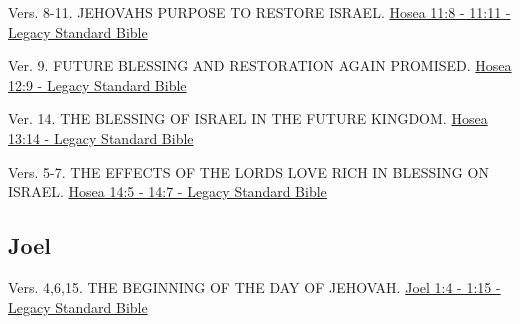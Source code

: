 \documentclass[
  ignorenonframetext,
]{beamer}
\begin{document}
\begin{frame}{11}
\label{section-115}
\begin{block}{Vers. 8-11. JEHOVAH\textquotesingle S PURPOSE TO RESTORE
ISRAEL.}
\label{vers.-8-11.-jehovahs-purpose-to-restore-israel.}
\href{https://read.lsbible.org/?q=hos11\%3A8-11}{Hosea 11:8 - 11:11 -
Legacy Standard Bible}
\end{block}
\end{frame}

\begin{frame}{12}
\label{section-116}
\begin{block}{Ver. 9. FUTURE BLESSING AND RESTORATION AGAIN PROMISED.}
\label{ver.-9.-future-blessing-and-restoration-again-promised.}
\href{https://read.lsbible.org/?q=hos12\%3A9}{Hosea 12:9 - Legacy
Standard Bible}
\end{block}
\end{frame}

\begin{frame}{13}
\label{section-117}
\begin{block}{Ver. 14. THE BLESSING OF ISRAEL IN THE FUTURE KINGDOM.}
\label{ver.-14.-the-blessing-of-israel-in-the-future-kingdom.}
\href{https://read.lsbible.org/?q=hos13\%3A14}{Hosea 13:14 - Legacy
Standard Bible}
\end{block}
\end{frame}

\begin{frame}{14}
\label{section-118}
\begin{block}{Vers. 5-7. THE EFFECTS OF THE LORD\textquotesingle S LOVE
RICH IN BLESSING ON ISRAEL.}
\label{vers.-5-7.-the-effects-of-the-lords-love-rich-in-blessing-on-israel.}
\href{https://read.lsbible.org/?q=hos14\%3A5-7}{Hosea 14:5 - 14:7 -
Legacy Standard Bible}
\end{block}
\end{frame}

\subsection{Joel}\label{joel}

\begin{frame}{1}
\label{section-119}
\begin{block}{Vers. 4,6,15. THE BEGINNING OF THE DAY OF JEHOVAH.}
\label{vers.-4615.-the-beginning-of-the-day-of-jehovah.}
\href{https://read.lsbible.org/?q=joel1\%3A4-15}{Joel 1:4 - 1:15 -
Legacy Standard Bible}
\end{block}
\end{frame}
\end{document}
